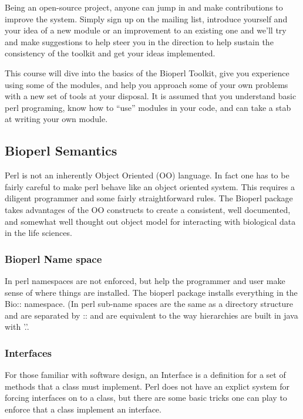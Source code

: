 \documentclass{article}
\begin{document}
\par
Being an open-source project, anyone can jump in and make
contributions to improve the system.  Simply sign up on the mailing
list, introduce yourself and your idea of a new module or an
improvement to an existing one and we'll try and make suggestions to
help steer you in the direction to help sustain the consistency of the
toolkit and get your ideas implemented. 

\par

This course will dive into the basics of the Bioperl Toolkit, give you
experience using some of the modules, and help you approach some of
your own problems with a new set of tools at your disposal.  It is
assumed that you understand basic perl programing, know how to ``use''
modules in your code, and can take a stab at writing your own module.


\subsection{Bioperl Semantics}

Perl is not an inherently Object Oriented (OO) language.  In fact one has
to be fairly careful to make perl behave like an object oriented
system.  This requires a diligent programmer and some fairly
straightforward rules.  The Bioperl package takes advantages of the OO
constructs to create a consistent, well documented, and somewhat well
thought out object model for interacting with biological data in the
life sciences.  

\subsubsection{Bioperl Name space}
In perl namespaces are not enforced, but help the programmer and user
make sense of where things are installed.  The bioperl package
installs everything in the Bio:: namespace.  (In perl sub-name spaces
are the same as a directory structure and are separated by :: and are
equivalent to the way hierarchies are built in java with '.'.

\subsubsection{Interfaces}
For those familiar with software design, an Interface is a definition
for a set of methods that a class must implement.  Perl does not have
an explict system for forcing interfaces on to a class, but there are
some basic tricks one can play to enforce that a class implement an interface. 
\end{document}

